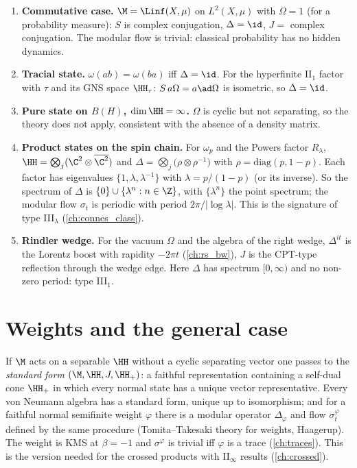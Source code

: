\begin{enumerate}
\item \textbf{Commutative case.} $\M=\Linf(X,\mu)$ on $L^2(X,\mu)$ with $\Omega=1$ (for a probability measure): $S$ is complex conjugation, $\Delta=\id$, $J=$ complex conjugation. The modular flow is trivial: classical probability has no hidden dynamics.
\item \textbf{Tracial state.} $\omega(ab)=\omega(ba)$ iff $\Delta=\id$. For the hyperfinite II$_1$ factor with $\tau$ and its GNS space $\HH_\tau$: $S\,a\Omega=a\ad\Omega$ is isometric, so $\Delta=\id$.
\item \textbf{Pure state on $B(H)$, $\dim\HH=\infty$.} $\Omega$ is cyclic but not separating, so the theory does not apply, consistent with the absence of a density matrix.
\item \textbf{Product states on the spin chain.} For $\omega_p$ and the Powers factor $R_\lambda$, $\HH=\bigotimes_j(\C^2\otimes\overline{\C^2})$ and $\Delta=\bigotimes_j\big(\rho\otimes\rho^{-1}\big)$ with $\rho=\mathrm{diag}(p,1-p)$. Each factor has eigenvalues $\{1,\lambda,\lambda^{-1}\}$ with $\lambda=p/(1-p)$ (or its inverse). So the spectrum of $\Delta$ is $\{0\}\cup\{\lambda^n:n\in\Z\}$, with $\{\lambda^n\}$ the point spectrum; the modular flow $\sigma_t$ is periodic with period $2\pi/|\log\lambda|$. This is the signature of type III$_\lambda$ (\cref{ch:connes_class}).
\item \textbf{Rindler wedge.} For the vacuum $\Omega$ and the algebra of the right wedge, $\Delta^{it}$ is the Lorentz boost with rapidity $-2\pi t$ (\cref{ch:rs_bw}), $J$ is the CPT-type reflection through the wedge edge. Here $\Delta$ has spectrum $[0,\infty)$ and no non-zero period: type III$_1$.
\end{enumerate}

\section{Weights and the general case}

If $\M$ acts on a separable $\HH$ without a cyclic separating vector one passes to the \emph{standard form} $(\M,\HH,J,\HH_+)$: a faithful representation containing a self-dual cone $\HH_+$ in which every normal state has a unique vector representative. Every von Neumann algebra has a standard form, unique up to isomorphism; and for a faithful normal semifinite weight $\varphi$ there is a modular operator $\Delta_\varphi$ and flow $\sigma^\varphi_t$ defined by the same procedure (Tomita--Takesaki theory for weights, Haagerup). The weight is KMS at $\beta=-1$ and $\sigma^\varphi$ is trivial iff $\varphi$ is a trace (\cref{ch:traces}). This is the version needed for the crossed products with II$_\infty$ results (\cref{ch:crossed}).

